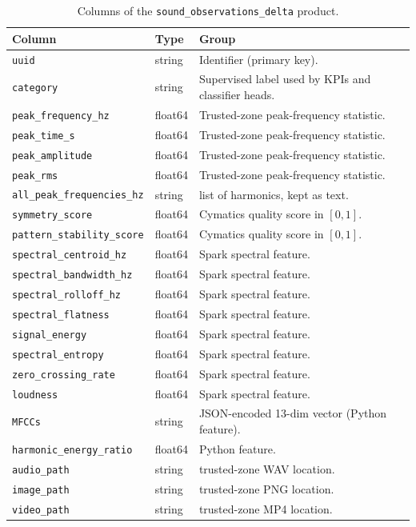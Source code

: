 \documentclass[11pt,a4paper]{article}
\begin{document}
\begin{table}[H]
\centering
\footnotesize
\renewcommand{\arraystretch}{1.15}
\begin{tabularx}{\textwidth}{@{}p{4.7cm}p{2.0cm}X@{}}
\toprule
\textbf{Column} & \textbf{Type} & \textbf{Group}\\
\midrule
\texttt{uuid}                          & string  & Identifier (primary key).\\
\texttt{category}                      & string  & Supervised label used by KPIs and classifier heads.\\
\texttt{peak\_frequency\_hz}           & float64 & Trusted-zone peak-frequency statistic.\\
\texttt{peak\_time\_s}                 & float64 & Trusted-zone peak-frequency statistic.\\
\texttt{peak\_amplitude}               & float64 & Trusted-zone peak-frequency statistic.\\
\texttt{peak\_rms}                     & float64 & Trusted-zone peak-frequency statistic.\\
\texttt{all\_peak\_frequencies\_hz}    & string  & list of harmonics, kept as text.\\
\texttt{symmetry\_score}               & float64 & Cymatics quality score in $[0,1]$.\\
\texttt{pattern\_stability\_score}     & float64 & Cymatics quality score in $[0,1]$.\\
\texttt{spectral\_centroid\_hz}        & float64 & Spark spectral feature.\\
\texttt{spectral\_bandwidth\_hz}       & float64 & Spark spectral feature.\\
\texttt{spectral\_rolloff\_hz}         & float64 & Spark spectral feature.\\
\texttt{spectral\_flatness}            & float64 & Spark spectral feature.\\
\texttt{signal\_energy}                & float64 & Spark spectral feature.\\
\texttt{spectral\_entropy}             & float64 & Spark spectral feature.\\
\texttt{zero\_crossing\_rate}          & float64 & Spark spectral feature.\\
\texttt{loudness}                      & float64 & Spark spectral feature.\\
\texttt{MFCCs}                         & string  & JSON-encoded 13-dim vector (Python feature).\\
\texttt{harmonic\_energy\_ratio}       & float64 & Python feature.\\
\texttt{audio\_path}                   & string  &  trusted-zone WAV location.\\
\texttt{image\_path}                   & string  &  trusted-zone PNG location.\\
\texttt{video\_path}                   & string  &  trusted-zone MP4 location.\\
\bottomrule
\end{tabularx}
\caption{Columns of the \texttt{sound\_observations\_delta} product.}
\label{tab:observation-schema}
\end{table}
\end{document}
